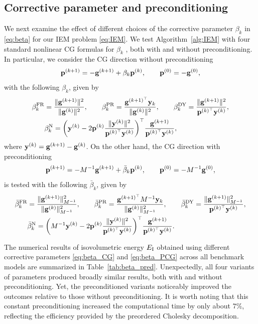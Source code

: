 \documentclass[11pt,a4paper]{article}
\begin{document}
\subsection{Corrective parameter and preconditioning}
\label{sec:6.2}
We next examine the effect of different choices of the corrective parameter $\beta_k$ in \eqref{eq:beta} for our IEM problem \eqref{eq:IEM}.
We test Algorithm~\ref{alg:IEM} with four standard nonlinear CG formulas for $\beta_k$ \cite{FlRe64,PoRi69,DaYu99,HaZh05}, both with and without preconditioning.
In particular, we consider the CG direction without preconditioning
\[
\mathbf{p}^{(k+1)} = -\mathbf{g}^{(k+1)} + \beta_k \mathbf{p}^{(k)}, \qquad \mathbf{p}^{(0)} = -\mathbf{g}^{(0)},
\]
with the following $\beta_k$, given by
\begin{align}
\beta_k^{\mathrm{FR}} &= \frac{\|\mathbf{g}^{(k+1)}\|^2}{\|\mathbf{g}^{(k)}\|^2}, \qquad
\beta_k^{\mathrm{PR}} = \frac{\mathbf{g}^{(k+1)^\top} \mathbf{y}_k}{\|\mathbf{g}^{(k)}\|^2}, \qquad
\beta_k^{\mathrm{DY}} = \frac{\|\mathbf{g}^{(k+1)}\|^2}{\mathbf{p}^{(k)^\top} \mathbf{y}^{(k)}}, \nonumber\\
&\beta_k^{\mathrm{N}} = \bigg( \mathbf{y}^{(k)} - 2 \mathbf{p}^{(k)} \frac{\|\mathbf{y}^{(k)}\|^2}{\mathbf{p}^{(k)^\top} \mathbf{y}^{(k)}}\bigg)^\top \frac{\mathbf{g}^{(k+1)}}{\mathbf{p}^{(k)^\top} \mathbf{y}^{(k)}},
\label{eq:beta_CG}
\end{align}
where $\mathbf{y}^{(k)} = \mathbf{g}^{(k+1)} - \mathbf{g}^{(k)}$.
On the other hand, the CG direction with preconditioning
\[
\mathbf{p}^{(k+1)} = - M^{-1}\mathbf{g}^{(k+1)} + \bar{\beta}_k \mathbf{p}^{(k)}, \qquad \mathbf{p}^{(0)} = -M^{-1}\mathbf{g}^{(0)},
\]
is tested with the following $\bar{\beta}_k$, given by
\begin{align}
\bar{\beta}_k^{\mathrm{FR}} &= \frac{\|\mathbf{g}^{(k+1)}\|^2_{M^{-1}}}{\|\mathbf{g}^{(k)}\|^2_{M^{-1}}}, \qquad
\bar{\beta}_k^{\mathrm{PR}} = \frac{\mathbf{g}^{(k+1)^\top} M^{-1} \mathbf{y}_k}{\|\mathbf{g}^{(k)}\|^2_{M^{-1}}}, \qquad
\bar{\beta}_k^{\mathrm{DY}} = \frac{\|\mathbf{g}^{(k+1)}\|^2_{M^{-1}}}{\mathbf{p}^{(k)^\top} \mathbf{y}^{(k)}}, \nonumber\\
&\bar{\beta}_k^{\mathrm{N}} = \bigg( M^{-1} \mathbf{y}^{(k)} - 2 \mathbf{p}^{(k)} \frac{\|\mathbf{y}^{(k)}\|^2}{\mathbf{p}^{(k)^\top} \mathbf{y}^{(k)}}\bigg)^\top \frac{\mathbf{g}^{(k+1)}}{\mathbf{p}^{(k)^\top} \mathbf{y}^{(k)}}.
\label{eq:beta_PCG}
\end{align}

The numerical results of isovolumetric energy $E_{\mathrm{I}}$ obtained using different corrective parameters \eqref{eq:beta_CG} and \eqref{eq:beta_PCG} across all benchmark models are summarized in Table~\ref{tab:beta_pred}. Unexpectedly, all four variants of parameters produced broadly similar results, both with and without preconditioning. Yet, the preconditioned variants noticeably improved the outcomes relative to those without preconditioning. It is worth noting that this constant preconditioning increased the computational time by only about $7\%$, reflecting the efficiency provided by the preordered Cholesky decomposition.
\end{document}
